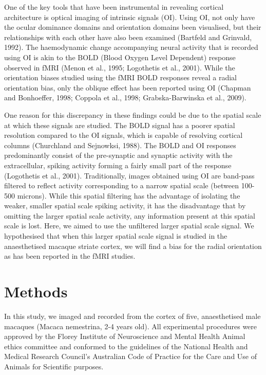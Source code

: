 	One of the key tools that have been instrumental in revealing cortical architecture is optical imaging of intrinsic signals (OI). Using OI, not only have the ocular dominance domains and orientation domains been visualised, but their relationships with each other have also been examined (Bartfeld and Grinvald, 1992). The haemodynamic change accompanying neural activity that is recorded using OI is akin to the BOLD (Blood Oxygen Level Dependent) response observed in fMRI (Menon et al., 1995; Logothetis et al., 2001). While the orientation biases studied using the fMRI BOLD responses reveal a radial orientation bias, only the oblique effect has been reported using OI (Chapman and Bonhoeffer, 1998; Coppola et al., 1998; Grabska-Barwinska et al., 2009).
	
	One reason for this discrepancy in these findings could be due to the spatial scale at which these signals are studied. The BOLD signal has a poorer spatial resolution compared to the OI signals, which is capable of resolving cortical columns (Churchland and Sejnowksi, 1988). The BOLD and OI responses predominantly consist of the pre-synaptic and synaptic activity with the extracellular, spiking activity forming a fairly small part of the response (Logothetis et al., 2001). Traditionally, images obtained using OI are band-pass filtered to reflect activity corresponding to a narrow spatial scale (between 100-500 microns). While this spatial filtering has the advantage of isolating the weaker, smaller spatial scale spiking activity, it has the disadvantage that by omitting the larger spatial scale activity, any information present at this spatial scale is lost. Here, we aimed to use the unfiltered larger spatial scale signal. We hypothesised that when this larger spatial scale signal is studied in the anaesthetised macaque striate cortex, we will find a bias for the radial orientation as has been reported in the fMRI studies. 
	
		
	\pagebreak
		
	\section{Methods}
	In this study, we imaged and recorded from the cortex of five, anaesthetised male macaques (Macaca nemestrina, 2-4 years old). All experimental procedures were approved by the Florey Institute of Neuroscience and Mental Health Animal ethics committee and conformed to the guidelines of the National Health and Medical Research Council’s Australian Code of Practice for the Care and Use of Animals for Scientific purposes.
